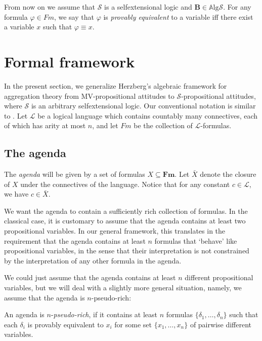 \documentclass{llncs}
\numberwithin{equation}{section}
\newcommand{\Sm}{\mathcal{S}}   \newcommand{\Lm}{\mathcal{L}}  \newcommand{\Fm}{\mathbf{Fm}}  \newcommand{\Hom}{\mathrm{Hom}}   \newcommand{\Al}{\mathbf{A}}  \newcommand{\BB}{\mathbf{B}}   \newcommand{\Alg}{\mathbb{A}\mathrm{lg}}
\begin{document}
From now on we assume that $\Sm$ is a selfextensional logic and $\BB\in\Alg\Sm$. For any formula $\varphi\in Fm$, we say that $\varphi$ is \emph{provably equivalent} to a variable iff there exist a variable $x$ such that $\varphi\equiv x$.

\section{Formal framework}
\label{Sec:framework}
In the present section, we generalize Herzberg's algebraic framework for aggregation theory from MV-propositional attitudes to $\Sm$-propositional attitudes, where $\Sm$ is an arbitrary selfextensional logic. Our conventional notation is similar to \cite{He13}. Let $\Lm$ be a logical language which contains countably many connectives, each of which has arity at most $n$, and let $Fm$ be the collection of $\Lm$-formulas.

\subsection{The agenda}\label{subsec:agenda}

The \emph{agenda} will be given by a set of formulas $X\subseteq \Fm$. Let $\bar{X}$ denote the closure of $X$ under the connectives of the language. Notice that for any constant $c\in\Lm$, we have $c\in \bar{X}$.

We want the agenda to contain a sufficiently rich collection of formulas.
In the classical case, it is customary to assume that the agenda contains at least two propositional variables.
In our general framework, this translates in the requirement that the agenda contains at least $n$ formulas that `behave' like propositional variables, in the sense that their interpretation is not constrained by the interpretation of any other formula in the agenda.

We could just assume that the agenda contains at least $n$ different propositional variables, but we will deal with a slightly more general situation, namely, we assume that the agenda is $n$-pseudo-rich:

\begin{definition}\label{def:pseudo:rich}
An agenda is $n$-\emph{pseudo-rich}, if it contains at least $n$ formulas $\{\delta_{1},\dots,\delta_{n}\}$ such that each $\delta_{i}$ is provably equivalent to $x_i$ for some set $\{x_1,\ldots, x_n\}$ of pairwise different variables.
\end{definition}
\end{document}
